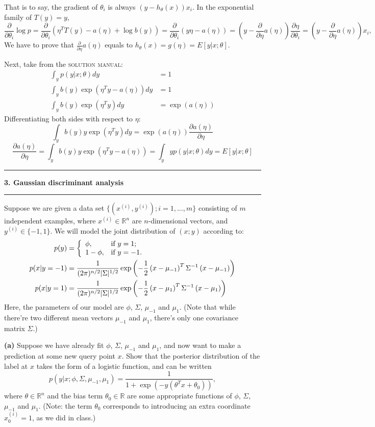 \documentclass[11pt]{article}
\newcommand\question[2]{\vspace{.25in}\hrule\textbf{#1. #2}\vspace{.5em}\hrule\vspace{.10in}}
\renewcommand\part[1]{\vspace{.10in}\textbf{(#1)  }}
\begin{document}
That is to say, the gradient of $\theta_i$ is always $(y - h_\theta(x))x_i$. In the exponential family of $T(y) = y$,
$$\frac{\partial}{\partial \theta_i}\log p = \frac{\partial}{\partial \theta_i}\left(\eta^TT(y) - a(\eta) + \log b(y)\right) = \frac{\partial}{\partial \theta_i}\left(y\eta - a(\eta)\right) = (y-\frac{\partial}{\partial \eta}a(\eta))\frac{\partial \eta}{\partial \theta_i} = (y-\frac{\partial}{\partial \eta}a(\eta))x_i,$$
We have to prove that $\frac{\partial}{\partial \eta}a(\eta)$ equals to $h_\theta(x)=g(\eta) = E[y|x;\theta]$.

Next, take from the \textsc{solution manual}:
\begin{align*}
\int_{y}p(y|x; \theta) dy &= 1\\
\int_{y}b(y)\exp(\eta^Ty-a(\eta))dy &= 1\\
\int_{y}b(y)\exp(\eta^Ty)dy &= \exp(a(\eta))
\end{align*}
Differentiating both sides with respect to $\eta$:
$$\int_{y}b(y)y\exp(\eta^Ty)dy = \exp(a(\eta))\frac{\partial a(\eta)}{\partial \eta}$$
$$\frac{\partial a(\eta)}{\partial \eta} = \int_{y}b(y)y\exp(\eta^Ty-a(\eta)) = \int_{y}yp(y|x; \theta)dy = E[y|x;\theta]$$

\question{3}{Gaussian discriminant analysis}
Suppose we are given a data set $\{(x^{(i)}, y^{(i)}); i = 1,\dots, m\}$ consisting of $m$ independent examples, where $x^{(i)} \in \mathbb{R}^n$ are $n$-dimensional vectors, and $y^{(i)} \in \{-1, 1\}$. We will model the joint distribution of $(x; y)$ according to:
\begin{align*}
  p(y) & =\left\{
               \begin{array}{ll}
                 \phi, & \hbox{if $y=1$;} \\
                 1-\phi, & \hbox{if $y=-1$.}
               \end{array}
             \right.   \\
  p(x|y=-1) & = \frac{1}{(2\pi)^{n/2}|\Sigma|^{1/2}}\exp\left(-\frac{1}{2}\left(x-\mu_{-1}\right)^T\Sigma^{-1}\left(x-\mu_{-1}\right)\right)\\
p(x|y=1) & = \frac{1}{(2\pi)^{n/2}|\Sigma|^{1/2}}\exp\left(-\frac{1}{2}\left(x-\mu_{1}\right)^T\Sigma^{-1}\left(x-\mu_{1}\right)\right)
\end{align*}
Here, the parameters of our model are $\phi$, $\Sigma$, $\mu_{-1}$ and $\mu_1$. (Note that while there're two different mean vectors $\mu_{-1}$ and $\mu_1$, there's only one covariance matrix $\Sigma$.)

\part{a} Suppose we have already fit $\phi$, $\Sigma$, $\mu_{-1}$ and $\mu_1$, and now want to make a prediction at some new query point $x$. Show that the posterior distribution of the label at $x$ takes the form of a logistic function, and can be written$$p(y | x; \phi, \Sigma, \mu_{-1}, \mu_1) = \frac{1}{1+\exp(-y(\theta^Tx+\theta_0))},$$
where $\theta \in \mathbb{R}^n$ and the bias term $\theta_0 \in \mathbb{R}$ are some appropriate functions of $\phi$, $\Sigma$, $\mu_{-1}$ and $\mu_1$. (Note: the term $\theta_0$ corresponds to introducing an extra coordinate $x^{(i)}_0 = 1$, as we did in class.)
\end{document}

